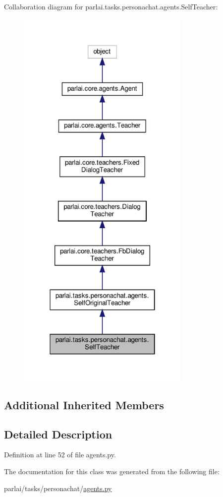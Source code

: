 Collaboration diagram for parlai.\+tasks.\+personachat.\+agents.\+Self\+Teacher\+:
\nopagebreak
\begin{figure}[H]
\begin{center}
\leavevmode
\includegraphics[width=238pt]{classparlai_1_1tasks_1_1personachat_1_1agents_1_1SelfTeacher__coll__graph}
\end{center}
\end{figure}
\subsection*{Additional Inherited Members}


\subsection{Detailed Description}


Definition at line 52 of file agents.\+py.



The documentation for this class was generated from the following file\+:\begin{DoxyCompactItemize}
\item 
parlai/tasks/personachat/\hyperlink{parlai_2tasks_2personachat_2agents_8py}{agents.\+py}\end{DoxyCompactItemize}
